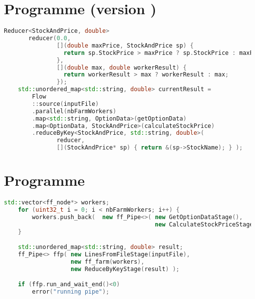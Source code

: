 \section{Programme  (version \ppff)}
\begin{lstlisting}[gobble=4,basicstyle=\ttfamily\footnotesize,language=c++]
    Reducer<StockAndPrice, double>
       reducer(0.0, 
               [](double maxPrice, StockAndPrice sp) {
                 return sp.StockPrice > maxPrice ? sp.StockPrice : maxPrice; 
               },
               [](double max, double workerResult) { 
                 return workerResult > max ? workerResult : max; 
               });
    std::unordered_map<std::string, double> currentResult =
        Flow
        ::source(inputFile)
        .parallel(nbFarmWorkers)
        .map<std::string, OptionData>(getOptionData)
        .map<OptionData, StockAndPrice>(calculateStockPrice)
        .reduceByKey<StockAndPrice, std::string, double>(
               reducer, 
               [](StockAndPrice* sp) { return &(sp->StockName); } );
\end{lstlisting}

\newpage
\section{Programme }
\begin{lstlisting}[gobble=4,basicstyle=\ttfamily\footnotesize,language=c++]
    std::vector<ff_node*> workers;
    for (uint32_t i = 0; i < nbFarmWorkers; i++) {
        workers.push_back(  new ff_Pipe<>( new GetOptionDataStage(),
                                           new CalculateStockPriceStage() ) );
    }        

    std::unordered_map<std::string, double> result;
    ff_Pipe<> ffp( new LinesFromFileStage(inputFile),
                   new ff_farm(workers),
                   new ReduceByKeyStage(result) );

    if (ffp.run_and_wait_end()<0)
        error("running pipe");
\end{lstlisting}
